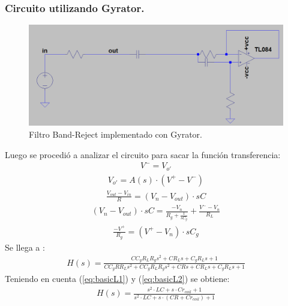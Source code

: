 \documentclass[a4paper]{article}
\begin{document}
\subsubsection{Circuito utilizando Gyrator.}
\begin{figure}[H]	
	\centering
	\includegraphics[width=\textwidth]{ImagenesEj2/gyrBR.PNG}
	\caption{Filtro Band-Reject implementado con Gyrator.}
	\label{fig:gyrBR}
\end{figure}
Luego se procedió a analizar el circuito para sacar la función transferencia:
\begin{align}V^- = V_{o'}\end{align}
\begin{align}V_{o'} = A(s)\cdot (V^+-V^-)\end{align}
\begin{align}\frac{V_{out}-V_{in}}{R}=(V_n-V_{out})\cdot sC\end{align}
\begin{align}(V_n-V_{out})\cdot sC = \frac{-V_n}{R_g+\frac{1}{sC_g}}+\frac{V^--V_n}{R_L}\end{align}
\begin{align}\frac{-V^+}{R_g}=(V^+-V_n)\cdot sC_g\end{align}
Se llega a :
\begin{align}  H(s)=\frac{C C_{g} R_{L} R_{g} s^{2} + C R_{L} s + C_{g} R_{L} s + 1}{C C_{g} R R_{L} s^{2} + C C_{g} R_{L} R_{g} s^{2} + C R s + C R_{L} s + C_{g} R_{L} s + 1} \end{align}
Teniendo en cuenta (\ref{eq:basicL1}) y (\ref{eq:basicL2}) se obtiene:
\begin{align}  H(s)=\frac{ s^{2}\cdot  LC + s \cdot  C r_{coil} + 1}{ s^{2}\cdot LC + s\cdot (C R+Cr_{coil}) + 1} 
\label{eq:BRG}
\end{align}
\end{document}
